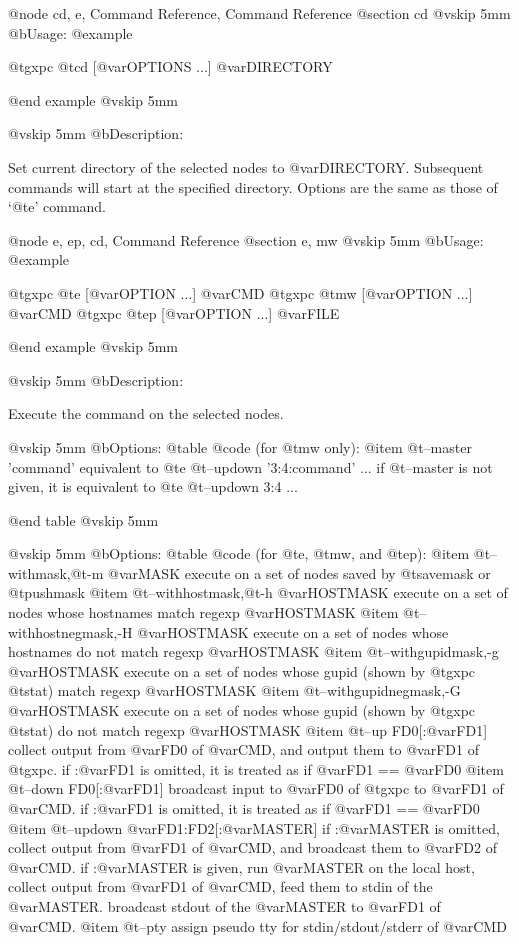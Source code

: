 @node cd, e, Command Reference, Command Reference
@section cd
@vskip 5mm
@b{Usage:}
@example

  @t{gxpc} @t{cd} [@var{OPTIONS} ...] @var{DIRECTORY}

@end example
@vskip 5mm

@vskip 5mm
@b{Description:}


  Set current directory of the selected nodes to @var{DIRECTORY}.
Subsequent commands will start at the specified directory.
Options are the same as those of `@t{e}' command.

@node e, ep, cd, Command Reference
@section e, mw
@vskip 5mm
@b{Usage:}
@example

  @t{gxpc} @t{e}  [@var{OPTION} ...] @var{CMD}
  @t{gxpc} @t{mw} [@var{OPTION} ...] @var{CMD}
  @t{gxpc} @t{ep} [@var{OPTION} ...] @var{FILE}

@end example
@vskip 5mm

@vskip 5mm
@b{Description:}


  Execute the command on the selected nodes.

@vskip 5mm
@b{Options: }
@table @code
(for @t{mw} only):
@item   @t{--master} 'command'
    equivalent to @t{e} @t{--updown} '3:4:command' ...
  if @t{--master} is not given, it is equivalent to @t{e} @t{--updown} 3:4 ...

@end table
@vskip 5mm

@vskip 5mm
@b{Options: }
@table @code
(for @t{e}, @t{mw}, and @t{ep}):
@item   @t{--withmask},@t{-m} @var{MASK}
    execute on a set of nodes saved by @t{savemask} or @t{pushmask}
@item   @t{--withhostmask},@t{-h} @var{HOSTMASK}
    execute on a set of nodes whose hostnames match regexp @var{HOSTMASK}
@item   @t{--withhostnegmask},-H @var{HOSTMASK}
    execute on a set of nodes whose hostnames do not match regexp @var{HOSTMASK}
@item   @t{--withgupidmask},-g @var{HOSTMASK}
    execute on a set of nodes whose gupid (shown by @t{gxpc} @t{stat}) 
    match regexp @var{HOSTMASK}
@item   @t{--withgupidnegmask},-G @var{HOSTMASK}
    execute on a set of nodes whose gupid (shown by @t{gxpc} @t{stat}) 
    do not match regexp @var{HOSTMASK}
@item   @t{--up} FD0[:@var{FD1}]
    collect output from @var{FD0} of @var{CMD}, and output them to @var{FD1} of @t{gxpc}.
    if :@var{FD1} is omitted, it is treated as if @var{FD1} == @var{FD0}
@item   @t{--down} FD0[:@var{FD1}]
    broadcast input to @var{FD0} of @t{gxpc} to @var{FD1} of @var{CMD}.
    if :@var{FD1} is omitted, it is treated as if @var{FD1} == @var{FD0}
@item   @t{--updown} @var{FD1}:FD2[:@var{MASTER}]
    if :@var{MASTER} is omitted, collect output from @var{FD1} of @var{CMD},
    and broadcast them to @var{FD2} of @var{CMD}.
    if :@var{MASTER} is given, run @var{MASTER} on the local host, collect
    output from @var{FD1} of @var{CMD}, feed them to stdin of the @var{MASTER}.
    broadcast stdout of the @var{MASTER} to @var{FD1} of @var{CMD}.
@item   @t{--pty}
    assign pseudo tty for stdin/stdout/stderr of @var{CMD}

